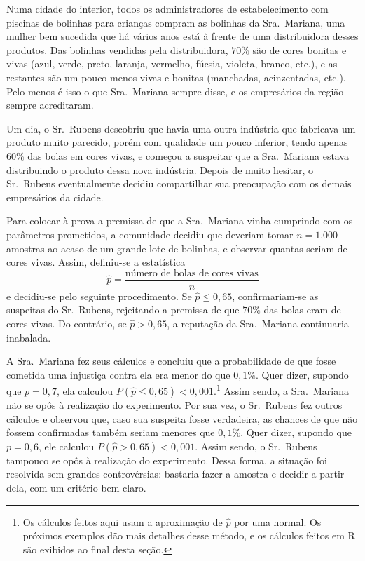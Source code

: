 \documentclass[12pt,a4paper]{article}
\theoremstyle{plain}
\theoremstyle{definition}
\theoremstyle{remark}
\newenvironment{example}{\pushQED{\qed}\renewcommand{\qedsymbol}{\scriptsize$\triangle$}\examplex}{\popQED\endexamplex}
\begin{document}
\begin{example}
Numa cidade do interior, todos os administradores de estabelecimento com piscinas de bolinhas para crianças compram as bolinhas da Sra.~Mariana, uma mulher bem sucedida que há vários anos está à frente de uma distribuidora desses produtos.
Das bolinhas vendidas pela distribuidora, $70\%$ são de cores bonitas e vivas (azul, verde, preto, laranja, vermelho, fúcsia, violeta, branco, etc.), e as restantes são um pouco menos vivas e bonitas (manchadas, acinzentadas, etc.).
Pelo menos é isso o que Sra.~Mariana sempre disse, e os empresários da região sempre acreditaram.

Um dia, o Sr.~Rubens descobriu que havia uma outra indústria que fabricava um produto muito parecido, porém com qualidade um pouco inferior, tendo apenas $60\%$ das bolas em cores vivas, e começou a suspeitar que a Sra.~Mariana estava distribuindo o produto dessa nova indústria.
Depois de muito hesitar, o Sr.~Rubens eventualmente decidiu compartilhar sua preocupação com os demais empresários da cidade.

Para colocar à prova a premissa de que a Sra.~Mariana vinha cumprindo com os parâmetros prometidos, a comunidade decidiu que deveriam tomar $n=1.000$ amostras ao acaso de um grande lote de bolinhas, e observar quantas seriam de cores vivas.
Assim, definiu-se a estatística
\[
\hat{p} = \frac{\text{número de bolas de cores vivas}}{n}
\]
e decidiu-se pelo seguinte procedimento.
Se $\hat{p} \leq 0,65$, confirmariam-se as suspeitas do Sr.~Rubens, rejeitando a premissa de que $70\%$ das bolas eram de cores vivas.
Do contrário, se $\hat{p}>0,65$, a reputação da Sra.~Mariana continuaria inabalada.

A Sra.~Mariana fez seus cálculos e concluiu que a probabilidade de que fosse cometida uma injustiça contra ela era menor do que $0,1\%$.
Quer dizer, supondo que $p=0,7$, ela calculou $P(\hat{p} \leq 0,65) < 0,001$.\footnote{Os cálculos feitos aqui usam a aproximação de $\hat{p}$ por uma normal. Os próximos exemplos dão mais detalhes desse método, e os cálculos feitos em R são exibidos ao final desta seção.}
Assim sendo, a Sra.~Mariana não se opôs à realização do experimento.
Por sua vez, o Sr.~Rubens fez outros cálculos e observou que, caso sua suspeita fosse verdadeira, as chances de que não fossem confirmadas também seriam menores que $0,1\%$.
Quer dizer, supondo que $p=0,6$, ele calculou $P(\hat{p} > 0,65) < 0,001$.
Assim sendo, o Sr.~Rubens tampouco se opôs à realização do experimento.
Dessa forma, a situação foi resolvida sem grandes controvérsias: bastaria fazer a amostra e decidir a partir dela, com um critério bem claro.
\end{example}
\end{document}
